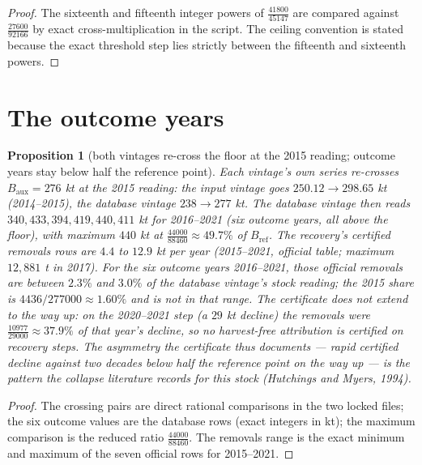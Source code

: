 \documentclass[10pt,twocolumn]{article}
\theoremstyle{plain}
\newtheorem{proposition}[theorem]{Proposition}
\theoremstyle{remark}
\begin{document}
\begin{proof}
The sixteenth and fifteenth integer powers of
\(\tfrac{41800}{45147}\) are compared against
\(\tfrac{27600}{92166}\) by exact cross-multiplication in the script.
The ceiling convention is stated because the exact threshold step lies
strictly between the fifteenth and sixteenth powers.
\end{proof}

\section{The outcome years}\label{outcome}

\begin{proposition}[both vintages re-cross the floor at the 2015
reading; outcome years stay below half the reference point]
\label{prop:recovery}
Each vintage's own series re-crosses \(B_{\mathrm{aux}} = 276\) kt at
the 2015 reading: the input vintage goes \(250.12 \to 298.65\) kt
(2014--2015), the database vintage \(238 \to 277\) kt. The database
vintage then reads \(340, 433, 394, 419, 440, 411\) kt for
2016--2021 (six outcome years, all above the floor), with maximum
\(440\) kt at \(\tfrac{44000}{88460} \approx 49.7\%\) of
\(B_{\mathrm{ref}}\). The recovery's certified removals rows are
\(4.4\) to \(12.9\) kt per year (2015--2021, official table; maximum
\(12{,}881\) t in 2017). For the six outcome years 2016--2021,
those official removals are between \(2.3\%\) and \(3.0\%\) of
the database vintage's stock reading; the 2015 share is
\(4436/277000\approx1.60\%\) and is not in that range. The certificate does not
extend to the way up: on the 2020--2021 step (a \(29\) kt decline)
the removals were \(\tfrac{10977}{29000} \approx 37.9\%\) of that
year's decline, so no harvest-free attribution is certified on
recovery steps. The asymmetry the certificate thus documents --- rapid
certified decline against two decades below half the reference point on
the way up --- is the pattern the collapse literature records for this
stock (Hutchings and Myers, 1994).
\end{proposition}

\begin{proof}
The crossing pairs are direct rational comparisons in the two locked
files; the six outcome values are the database rows (exact integers in
kt); the maximum comparison is the reduced ratio
\(\tfrac{44000}{88460}\). The removals range is the exact minimum and
maximum of the seven official rows for 2015--2021.
\end{proof}
\end{document}

